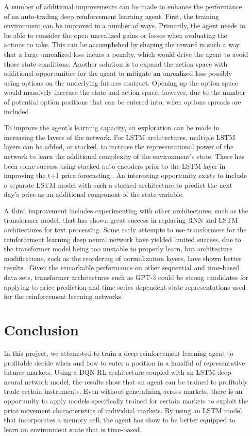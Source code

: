 \documentclass[10pt,twocolumn,letterpaper]{article}
\begin{document}
A number of additional improvements can be made to enhance the performance of an auto-trading deep reinforcement learning agent. First, the training environment can be improved in a number of ways. Primarily, the agent needs to be able to consider the open unrealized gains or losses when evaluating the actions to take. This can be accomplished by shaping the reward in such a way that a large unrealized loss incurs a penalty, which would drive the agent to avoid those state conditions. Another solution is to expand the action space with additional opportunities for the agent to mitigate an unrealized loss possibly using options on the underlying futures contract. Opening up the option space would massively increase the state and action space, however, due to the number of potential option positions that can be entered into, when options spreads are included.

To improve the agent's learning capacity, an exploration can be made in increasing the layers of the network. For LSTM architectures, multiple LSTM layers can be added, or stacked, to increase the representational power of the network to learn the additional complexity of the environment's state. There has been some success using stacked auto-encoders prior to the LSTM layer in improving the t+1 price forecasting \cite{stackedlstm}. An interesting opportunity exists to include a separate LSTM model with such a stacked architecture to predict the next day's price as an additional component of the state variable. 

A third improvement includes experimenting with other architectures, such as the transformer model, that has shown great success in replacing RNN and LSTM architectures for text processing. Some early attempts to use transformers for the reinforcement learning deep neural network have yielded limited success, due to the transformer model being too unstable to properly learn, but architecture modifications, such as the reordering of normalization layers, have shown better results.\cite{transformers}. Given the remarkable performance on other sequential and time-based data sets, transformer architectures such as GPT-3 could be strong candidates for applying to price prediction and time-series dependent state representations used for the reinforcement learning networks.

\section{Conclusion}
In this project, we attempted to train a deep reinforcement learning agent to profitable decide when and how to enter a position in a handful of representative futures markets. Using a DQN RL architecture coupled with an LSTM deep neural network model, the results show that an agent can be trained to profitably trade certain instruments. Even without generalizing across markets, there is an opportunity to apply models specifically trained for certain markets to exploit the price movement characteristics of individual markets. By using an LSTM model that incorporates a memory cell, the agent has show to be better equipped to learn an environment state that is time-based.
\end{document}
